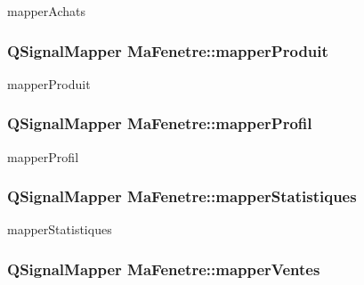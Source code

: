 mapper\-Achats 

\hypertarget{class_ma_fenetre_a7345ec3b89dedf18ae6297d77c5653b4}{
\subsubsection[{mapper\-Produit}]{\setlength{\rightskip}{0pt plus 5cm}Q\-Signal\-Mapper Ma\-Fenetre\-::mapper\-Produit\hspace{0.3cm}{\ttfamily [protected]}}}\label{class_ma_fenetre_a7345ec3b89dedf18ae6297d77c5653b4}


mapper\-Produit 

\hypertarget{class_ma_fenetre_a0629af8324c4d673fe70f55ead4e7b8a}{
\subsubsection[{mapper\-Profil}]{\setlength{\rightskip}{0pt plus 5cm}Q\-Signal\-Mapper Ma\-Fenetre\-::mapper\-Profil\hspace{0.3cm}{\ttfamily [protected]}}}\label{class_ma_fenetre_a0629af8324c4d673fe70f55ead4e7b8a}


mapper\-Profil 

\hypertarget{class_ma_fenetre_ad5133adcd9cb734a07b9534996224d15}{
\subsubsection[{mapper\-Statistiques}]{\setlength{\rightskip}{0pt plus 5cm}Q\-Signal\-Mapper Ma\-Fenetre\-::mapper\-Statistiques\hspace{0.3cm}{\ttfamily [protected]}}}\label{class_ma_fenetre_ad5133adcd9cb734a07b9534996224d15}


mapper\-Statistiques 

\hypertarget{class_ma_fenetre_a68f5911be4ba075ef635413eee34b623}{
\subsubsection[{mapper\-Ventes}]{\setlength{\rightskip}{0pt plus 5cm}Q\-Signal\-Mapper Ma\-Fenetre\-::mapper\-Ventes\hspace{0.3cm}{\ttfamily [protected]}}}\label{class_ma_fenetre_a68f5911be4ba075ef635413eee34b623}


